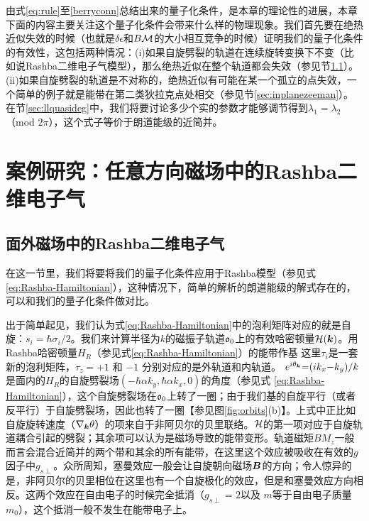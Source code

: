 由式\ref{eq:rule}至\ref{berryconn}总结出来的量子化条件，是本章的理论性的进展，本章下面的内容主要关注这个量子化条件会带来什么样的物理现象。我们首先要在绝热近似失效的时候（也就是$\delta \epsilon$和$B{\cal M}$的大小相互竞争的时候）证明我们的量子化条件的有效性，这包括两种情况：(i)如果自旋劈裂的轨道在连续旋转变换下不变（比如说Rashba二维电子气模型），那么绝热近似在整个轨道都会失效（参见节\ref{sec:Rashba}）。(ii)如果自旋劈裂的轨道是不对称的，绝热近似有可能在某一个孤立的点失效，一个简单的例子就是能带在第二类狄拉克点处相交（参见节\ref{sec:inplanezeeman}）。在节\ref{sec:llquasideg}中，我们将要讨论多少个实的参数才能够调节得到$\lambda_1{=}\lambda_2$（mod $2\pi$），这个式子等价于朗道能级的近简并。


\section{案例研究：任意方向磁场中的Rashba二维电子气}

\subsection{面外磁场中的Rashba二维电子气}\label{sec:Rashba}

在这一节里，我们将要将我们的量子化条件应用于Rashba模型（参见式\ref{eq:Rashba-Hamiltonian}），这种情况下，简单的解析的朗道能级的解式存在的，可以和我们的量子化条件做对比\cite{bychkov_oscillatory_1984}。

出于简单起见，我们认为式\ref{eq:Rashba-Hamiltonian}中的泡利矩阵对应的就是自旋：$s_i{=}\hbar \sigma_i/2$。我们来计算半径为$k$的磁振子轨道$\mathfrak{o}_0$上的有效哈密顿量${\cal H}(\boldsymbol{k})$。用Rashba哈密顿量$H_R$（参见式\ref{eq:Rashba-Hamiltonian}）的能带作基
这里$\tau_i$是一套新的泡利矩阵，$\tau_z{=}{+} 1$ 和 ${-}1$ 分别对应的是外轨道和内轨道。 $e^{i\theta_{\boldsymbol{k}}}{=}(ik_x{-}k_y)/k$是面内的$H_R$的自旋劈裂场$(-\hbar\alpha k_y,\hbar\alpha k_x,0)$的角度（参见式 \ref{eq:Rashba-Hamiltonian}），这个自旋劈裂场在$\mathfrak{o}_0$上转了一圈；由于我们基的自旋平行（或者反平行）于自旋劈裂场，因此也转了一圈【参见图\ref{fig:orbits}(b)】。上式中正比如自旋旋转速度（$\nabla_{\boldsymbol{k}} \theta$）的项来自于非阿贝尔的贝里联络。${\cal H}$的第一项对应于自旋轨道耦合引起的劈裂；其余项可以认为是磁场导致的能带变形。轨道磁矩$B M_z$一般而言会混合近简并的两个带和其余的所有能带，在这里这个效应被吸收在有效的$g$因子中$g_{s\perp}$。众所周知，塞曼效应一般会让自旋朝向磁场$\boldsymbol{B}$的方向；令人惊异的是，非阿贝尔的贝里相位在这里也有一个自旋极化的效应，但是和塞曼效应方向相反。这两个效应在自由电子的时候完全抵消（$g_{s\perp}=2$以及 $m$等于自由电子质量$m_0$），这个抵消一般不发生在能带电子上。


